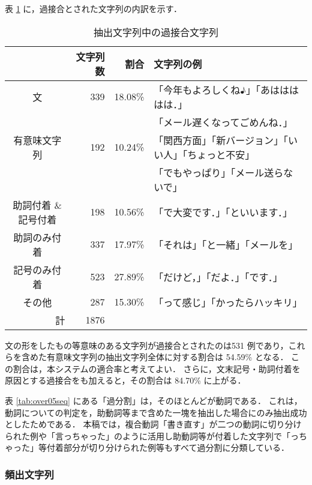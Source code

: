 表 \ref{tab:over05u} に，過接合とされた文字列の内訳を示す．
\begin{table}[hbt]
\begin{minipage}{\textwidth}
\begin{center}
\caption{抽出文字列中の過接合文字列}
\label{tab:over05u}
\begin{tabular}{crrl}
\hline
\hline
                  & 文字列数 & 割合 & 文字列の例\\
\hline
文                & 339 & 18.08\% & 「今年もよろしくね♪」「あははははは．」 \\
                  &     &         & 「メール遅くなってごめんね．」\\
有意味文字列      & 192 & 10.24\% & 「関西方面」「新バージョン」「いい人」「ちょっと不安」\\
                  &     &         & 「でもやっぱり」「メール送らないで」\\
助詞付着 \& 記号付着 & 198 & 10.56\% & 「で大変です．」「といいます．」\\
助詞のみ付着      & 337 & 17.97\% & 「それは」「と一緒」「メールを」\\
記号のみ付着      & 523 & 27.89\% & 「だけど，」「だよ．」「です．」\\
その他            & 287 & 15.30\% & 「って感じ」「かったらハッキリ」\\
\hline
\multicolumn{1}{r}{計} & 1876 & \\
\hline
\hline
\end{tabular}
\end{center}
\end{minipage}
\end{table}
文の形をしたもの等意味のある文字列が過接合とされたのは531 例であり，これらを含めた有意味文字列の抽出文字列全体に対する割合は 54.59\% となる．
この割合は，本システムの適合率と考えてよい．
さらに，文末記号・助詞付着を原因とする過接合をも加えると，その割合は 84.70\% に上がる．

表 \ref{tab:over05seq} にある「過分割」は，そのほとんどが動詞である．
これは，動詞についての判定を，助動詞等まで含めた一塊を抽出した場合にのみ抽出成功としたためである．
本稿では，複合動詞「書き直す」が二つの動詞に切り分けられた例や「言っちゃった」のように活用し助動詞等が付着した文字列で「っちゃった」等付着部分が切り分けられた例等もすべて過分割に分類している．
\subsubsection{頻出文字列}

